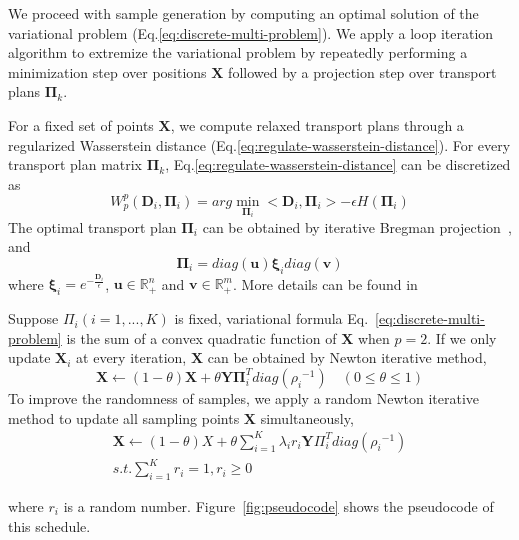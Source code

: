  We proceed with sample generation by computing an optimal solution of the variational problem (Eq.\ref{eq:discrete-multi-problem}).
 We apply a loop iteration algorithm to extremize the variational problem by repeatedly performing a minimization step over positions $\mathbf{X}$ followed by a projection step over transport plans $\mathbf{\Pi}_k$.

 For a fixed set of points $\mathbf X$,
 we compute  relaxed transport plans through a  regularized Wasserstein distance (Eq.\ref{eq:regulate-wasserstein-distance}).
 For every transport plan matrix $\mathbf{\Pi}_k$,
 Eq.\ref{eq:regulate-wasserstein-distance} can be discretized as
 \begin{equation}\label{eq:discrete-regulate-wasserstein-barycenter}
   W_p^p(\mathbf{D}_i,\mathbf{\Pi}_i)=arg\min\limits_{\mathbf{\Pi}_i}<\mathbf{D}_i,\mathbf{\Pi}_i>-\epsilon H(\mathbf{\Pi}_i)
 \end{equation}
The optimal transport plan $\mathbf{\Pi}_i$ can be obtained by iterative Bregman projection~\cite{cuturi:2013:sinkhorn,benamou:2015:iterative}, and
\begin{equation}\label{eq:transport-plan}
  \mathbf{\Pi}_i=diag(\mathbf{u})\mathbf{\xi}_idiag(\mathbf{v})
\end{equation}
where $\mathbf{\xi}_i=e^{-\frac{\mathbf{D}_i}{\epsilon}}$,
$\mathbf{u}\in \mathbb{R}_+^{n}$ and $\mathbf{v}\in\mathbb{R}_+^{m}$.
More details can be found in~\cite{cuturi:2013:sinkhorn,cuturi:2013:fast,benamou:2015:iterative}



Suppose $\Pi_i(i=1,...,K)$ is fixed,
variational formula Eq.~\ref{eq:discrete-multi-problem}
is the sum of a convex quadratic function of $\mathbf{X}$ when $p=2$.
If we only update $\mathbf{X}_i$ at every iteration,
$\mathbf{X}$ can be obtained by Newton iterative method,
\begin{equation}\label{eq:position-iterative}
  \mathbf{X}\leftarrow(1-\theta)\mathbf{X}+\theta\mathbf{Y}\mathbf{\Pi}_i^T diag({\rho_i}^{-1}) \quad (0\leq\theta\leq 1)
\end{equation}
To improve the randomness of samples,
we apply a random Newton iterative method to update all sampling points $\mathbf{X}$ simultaneously,
\begin{equation}
\begin{split}
\mathbf{X}\leftarrow(1-\theta)X+\theta\sum_{i=1}^K\lambda_ir_i\mathbf{Y}\Pi_i^Tdiag({\rho_i}^{-1})\\
 s.t. \sum\limits_{i=1}^{K}r_i=1, r_i\geq 0
 \end{split}
\end{equation}

where $r_i$ is a random number.
Figure~\ref{fig:pseudocode}
shows the pseudocode of this schedule.

